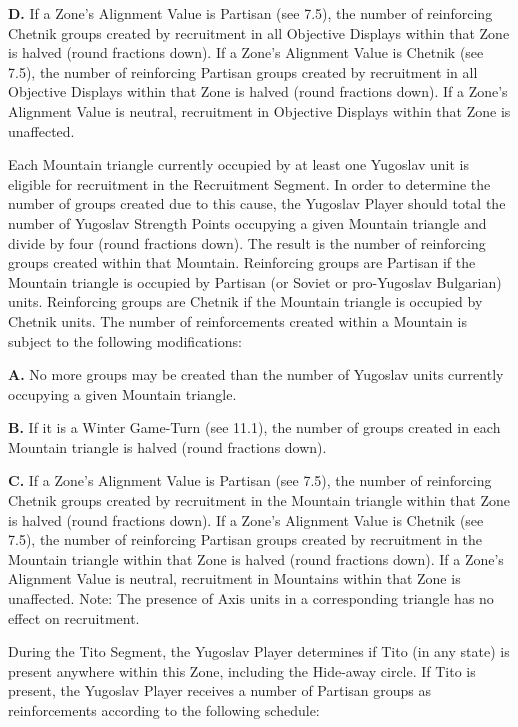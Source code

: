 \textbf{D.} If a Zone’s Alignment Value is Partisan (see 7.5), the number of reinforcing Chetnik groups created by recruitment in all Objective Displays within that Zone is halved (round fractions down). If a Zone’s Alignment Value is Chetnik (see 7.5), the number of reinforcing Partisan groups created by recruitment in all Objective Displays within that Zone is halved (round fractions down). If a Zone’s Alignment Value is neutral, recruitment in Objective Displays within that Zone is unaffected.

 Each Mountain triangle currently occupied by at least one Yugoslav unit is eligible for recruitment in the Recruitment Segment. In order to determine the number of groups created due to this cause, the Yugoslav Player should total the number of Yugoslav Strength Points occupying a given Mountain triangle and divide by four (round fractions down). The result is the number of reinforcing groups created within that Mountain. Reinforcing groups are Partisan if the Mountain triangle is occupied by Partisan (or Soviet or pro-Yugoslav Bulgarian) units. Reinforcing groups are Chetnik if the Mountain triangle is occupied by Chetnik units. The number of reinforcements created within a Mountain is subject to the following modifications:

\textbf{A.} No more groups may be created than the number of Yugoslav units currently occupying a given Mountain triangle.

\textbf{B.} If it is a Winter Game-Turn (see 11.1), the number of groups created in each Mountain triangle is halved (round fractions down).

\textbf{C.} If a Zone’s Alignment Value is Partisan (see 7.5), the number of reinforcing Chetnik groups created by recruitment in the Mountain triangle within that Zone is halved (round fractions down). If a Zone’s Alignment Value is Chetnik (see 7.5), the number of reinforcing Partisan groups created by recruitment in the Mountain triangle within that Zone is halved (round fractions down). If a Zone’s Alignment Value is neutral, recruitment in Mountains within that Zone is unaffected. Note: The presence of Axis units in a corresponding triangle has no effect on recruitment.

 During the Tito Segment, the Yugoslav Player determines if Tito (in
any state) is present anywhere within this Zone, including the Hide-away circle.
If Tito is present, the Yugoslav Player receives a number of Partisan groups as
reinforcements according to the following schedule:

